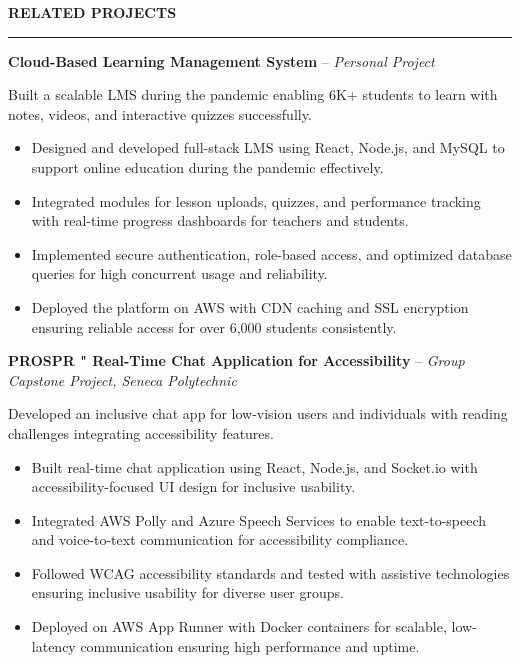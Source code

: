 \documentclass[10pt,letterpaper]{article}
\begin{document}
\vspace{6pt}

\textbf{RELATED PROJECTS}\\[-8pt]
\noindent\rule{\textwidth}{1pt}

\vspace{-2pt}

\textbf{Cloud-Based Learning Management System} -- \emph{Personal Project}

\vspace{-1pt}

Built a scalable LMS during the pandemic enabling 6K+ students to learn with notes, videos, and interactive quizzes successfully.
\vspace{-1pt}
\begin{itemize}
\item Designed and developed full-stack LMS using React, Node.js, and MySQL to support online education during the pandemic effectively.
\item Integrated modules for lesson uploads, quizzes, and performance tracking with real-time progress dashboards for teachers and students.
\item Implemented secure authentication, role-based access, and optimized database queries for high concurrent usage and reliability.
\item Deployed the platform on AWS with CDN caching and SSL encryption ensuring reliable access for over 6,000 students consistently.
\end{itemize}

\textbf{PROSPR " Real-Time Chat Application for Accessibility} -- \emph{Group Capstone Project, Seneca Polytechnic}

\vspace{-1pt}

Developed an inclusive chat app for low-vision users and individuals with reading challenges integrating accessibility features.
\vspace{-1pt}
\begin{itemize}
\item Built real-time chat application using React, Node.js, and Socket.io with accessibility-focused UI design for inclusive usability.
\item Integrated AWS Polly and Azure Speech Services to enable text-to-speech and voice-to-text communication for accessibility compliance.
\item Followed WCAG accessibility standards and tested with assistive technologies ensuring inclusive usability for diverse user groups.
\item Deployed on AWS App Runner with Docker containers for scalable, low-latency communication ensuring high performance and uptime.
\end{itemize}
\end{document}
